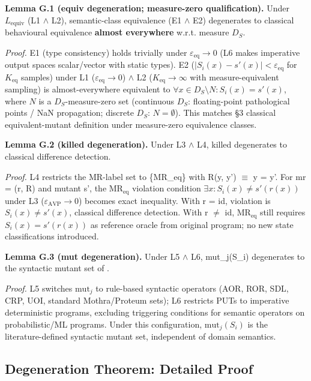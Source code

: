 \documentclass[manuscript,screen,review]{acmart}
\begin{document}
\textbf{Lemma G.1 (equiv degeneration; measure-zero
qualification).} Under $L_{\mathrm{equiv}}$ (L1 $\wedge$ L2), semantic-class equivalence
(E1 $\wedge$ E2) degenerates to classical behavioural equivalence
\textbf{almost everywhere} w.r.t. measure $D_S$.

\emph{Proof.} E1 (type consistency) holds trivially under $\varepsilon_{\mathrm{eq}} \to 0$ (L6
makes imperative output spaces scalar/vector with static types). E2
($|S_i(x) - s'(x)| < \varepsilon_{\mathrm{eq}}$ for $K_{\mathrm{eq}}$ samples)
under L1 ($\varepsilon_{\mathrm{eq}} \to 0$) $\wedge$ L2 ($K_{\mathrm{eq}} \to \infty$ with measure-equivalent sampling)
is almost-everywhere equivalent to $\forall x \in D_S \setminus N: S_i(x) = s'(x)$, where
$N$ is a $D_S$-measure-zero set (continuous $D_S$: floating-point
pathological points / NaN propagation; discrete $D_S$: $N = \emptyset$). This
matches \citet{jia2011analysis} §3 classical equivalent-mutant definition
under measure-zero equivalence classes.

\textbf{Lemma G.2 (killed degeneration).} Under L3 $\wedge$ L4, killed
degenerates to classical difference detection.

\emph{Proof.} L4 restricts the MR-label set to \{MR\_eq\} with R(y, y') $\equiv$ y = y'. For
mr = (r, R) and mutant s', the $\mathrm{MR}_{\mathrm{eq}}$ violation condition $\exists x: S_i(x) \neq
s'(r(x))$ under L3 ($\varepsilon_{\mathrm{AVP}} \to 0$) becomes exact inequality. With r = id,
violation is $S_i(x) \neq s'(x)$, classical difference detection. With r
$\neq$ id, $\mathrm{MR}_{\mathrm{eq}}$ still requires $S_i(x) = s'(r(x))$ as reference oracle from
original program; no new state classifications introduced.

\textbf{Lemma G.3 (mut degeneration).} Under L5 $\wedge$ L6, mut\_j(S\_i)
degenerates to the syntactic mutant set of \citet{jia2011analysis}.

\emph{Proof.} L5 switches $\mathrm{mut}_j$ to rule-based syntactic operators (AOR,
ROR, SDL, CRP, UOI, standard Mothra/Proteum sets); L6 restricts PUTs
to imperative deterministic programs, excluding triggering conditions
for semantic operators on probabilistic/ML programs. Under this
configuration, $\mathrm{mut}_j(S_i)$ is the literature-defined syntactic mutant
set, independent of domain semantics.

\subsection{Degeneration Theorem: Detailed Proof}\label{g.4-theorem-9.1-detailed-proof}
\end{document}
